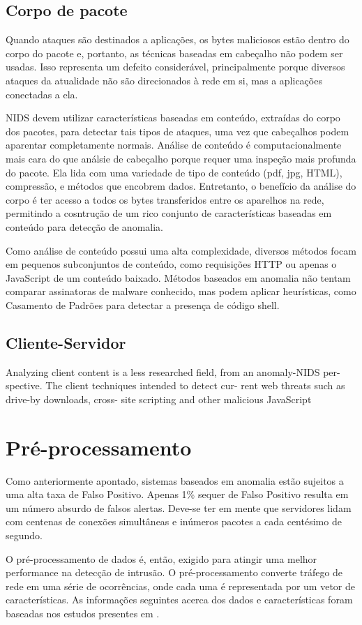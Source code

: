 \begin{enumerate}
\subsection{Corpo de pacote}
Quando ataques são destinados a aplicações, os bytes maliciosos estão dentro do corpo do
pacote e, portanto, as técnicas baseadas em cabeçalho não podem ser usadas. Isso representa um defeito considerável,
principalmente porque diversos ataques da atualidade não são direcionados à rede em si, mas a aplicações conectadas a
ela.
\par NIDS devem utilizar características baseadas em conteúdo, extraídas do corpo dos pacotes, para detectar tais tipos 
de ataques, uma vez que cabeçalhos podem aparentar completamente normais. Análise de conteúdo é computacionalmente 
mais cara do que análsie de cabeçalho porque requer uma inspeção mais profunda do pacote. Ela lida com uma variedade de 
tipo de conteúdo (pdf, jpg, HTML), compressão, e métodos que encobrem dados. Entretanto, o benefício da análise do
corpo é ter acesso a todos os bytes transferidos entre os aparelhos na rede, permitindo a cosntrução de um rico
conjunto de características baseadas em conteúdo para detecção de anomalia.
\par Como análise de conteúdo possui uma alta complexidade, diversos métodos focam em pequenos subconjuntos de
conteúdo, como requisições HTTP ou apenas o JavaScript de um conteúdo baixado. Métodos baseados em anomalia não tentam
comparar assinatoras de malware conhecido, mas podem aplicar heurísticas, como Casamento de Padrões para detectar a
presença de código shell.

\subsection{Cliente-Servidor}
Analyzing client content
is a less researched field, from an anomaly-NIDS per-
spective. The client techniques intended to detect cur-
rent web threats such as drive-by downloads, cross-
site scripting and other malicious JavaScript


\section{Pré-processamento}
Como anteriormente apontado, sistemas baseados em anomalia estão sujeitos a uma alta taxa de Falso Positivo. Apenas
1\% sequer de Falso Positivo resulta em um número absurdo de falsos alertas. Deve-se ter em mente que servidores lidam
com centenas de conexões simultâneas e inúmeros pacotes a cada centésimo de segundo.
\par O pré-processamento de dados é, então, exigido para atingir uma melhor performance na detecção de intrusão.
O pré-processamento converte tráfego de rede em uma série de ocorrências, onde cada uma é representada por um vetor
de características. As informações seguintes acerca dos dados e características foram baseadas nos estudos presentes
em \cite{davis11}.


\end{enumerate}
